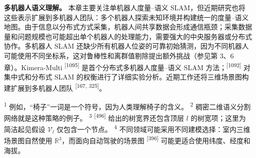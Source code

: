 \textbf{多机器人语义理解。} 本章主要关注单机器人度量--语义 SLAM，但近期研究也将这些表示扩展到多机器人团队：多个机器人探索未知环境并构建统一的度量--语义地图。由于信息以分布式方式采集，机器人间共享数据会形成通信瓶颈；采集数据量和问题规模也可能超出单个机器人的处理能力，需要强大的中央服务器或分布式协作。多机器人 SLAM 还缺少所有机器人位姿的可靠初始猜测，因为不同机器人可能使用不同坐标系，这对鲁棒性和离群值剔除提出额外挑战（参见第 3、6 章）。Kimera-Multi \textsuperscript{[1095]} 是首个分布式多机器人度量--语义 SLAM 方法；\textsuperscript{[1092]} 对集中式和分布式 SLAM 的权衡进行了详细实验分析。近期工作还将三维场景图构建扩展到多机器人团队 \textsuperscript{[167, 325]}。

\textsuperscript{1} 例如，“椅子”一词是一个符号，因为人类理解椅子的含义。
\textsuperscript{2} 稠密二维语义分割网络就是这种策略的例子。
\textsuperscript{3} \textsuperscript{[496]} 给出的树宽界还包含顶层 $l$ 的树宽项；这里为简洁起见假设 $\mathcal{V}_l$ 仅包含一个节点。
\textsuperscript{4} 不同领域可能采用不同建模选择：室内三维场景图自然使用 $\mathbb{R}^3$，而面向自动驾驶的场景图 \textsuperscript{[396]} 可能更适合使用纬度、经度和海拔。
